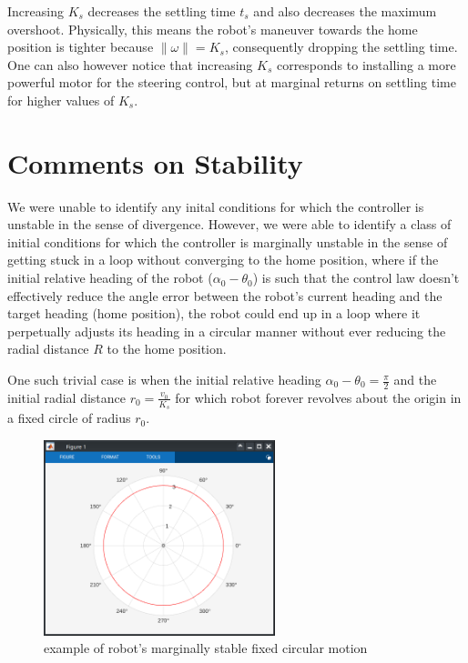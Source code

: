 \documentclass[12pt]{article}
\begin{document}
Increasing \(K_s\) decreases the settling time \(t_s\) and also decreases the maximum overshoot. Physically, this means the robot's maneuver towards the home position is tighter because \(\|\omega\|=K_s\), consequently dropping the settling time. One can also however notice that increasing \(K_s\) corresponds to installing a more powerful motor for the steering control, but at marginal returns on settling time for higher values of \(K_s\).

\section{Comments on Stability}

We were unable to identify any inital conditions for which the controller is unstable in the sense of divergence. However, we were able to identify a class of initial conditions for which the controller is marginally unstable in the sense of getting stuck in a loop without converging to the home position, where if the initial relative heading of the robot (\(\alpha_0-\theta_0\)) is such that the control law doesn't effectively reduce the angle error between the robot's current heading and the target heading (home position), the robot could end up in a loop where it perpetually adjusts its heading in a circular manner without ever reducing the radial distance \(R\) to the home position.

One such trivial case is when the initial relative heading \(\alpha_0-\theta_0=\frac{\pi}{2}\) and the initial radial distance \(\displaystyle r_0=\frac{v_0}{K_s}\) for which robot forever revolves about the origin in a fixed circle of radius \(r_0\).

\begin{figure}[ht!]
    \centering
    \includegraphics[width=0.6\textwidth]{images/circle.png}
    \caption{example of robot's marginally stable fixed circular motion}
\end{figure}
\end{document}
